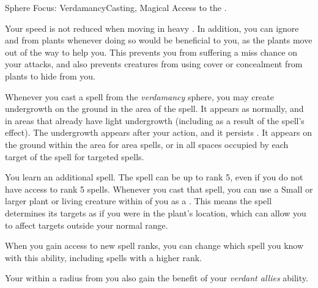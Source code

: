   \begin{magicalfeat}{Sphere Focus: Verdamancy}{Casting, Magical}
    \featpre Access to the  .

     Your speed is not reduced when moving in heavy .
    In addition, you can ignore  and  from plants whenever doing so would be beneficial to you, as the plants move out of the way to help you.
    This prevents you from suffering a miss chance on your attacks, and also prevents creatures from using cover or concealment from plants to hide from you.

     Whenever you cast a spell from the \textit{verdamancy} sphere, you may create undergrowth on the ground in the area of the spell.
    It appears as  normally, and  in areas that already have light undergrowth (including as a result of the spell's effect).
    The undergrowth appears after your action, and it persists .
    It appears on the ground within the area for area spells, or in all spaces occupied by each target of the spell for targeted spells.

     You learn an additional spell.
    The spell can be up to rank 5, even if you do not have access to rank 5 spells.
    Whenever you cast that spell, you can use a Small or larger plant or living creature within \medrange of you as a .
    This means the spell determines its targets as if you were in the plant's location, which can allow you to affect targets outside your normal range.

    When you gain access to new spell ranks, you can change which spell you know with this ability, including spells with a higher rank.

     Your  within a \largearea radius  from you also gain the benefit of your \textit{verdant allies} ability.
  \end{magicalfeat}

